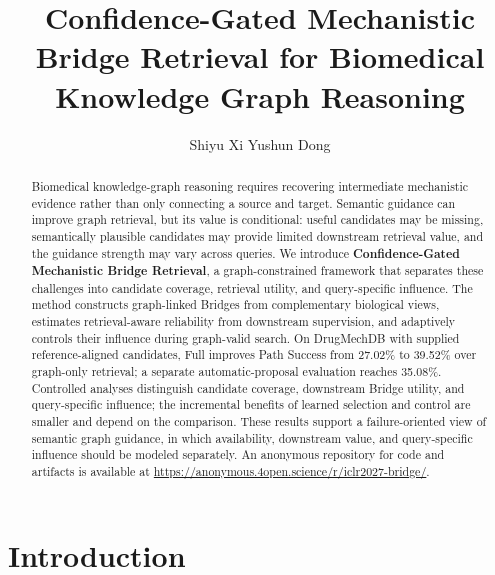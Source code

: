 \documentclass{article} %
\title{
Confidence-Gated Mechanistic\\
Bridge Retrieval for Biomedical\\
Knowledge Graph Reasoning
}
\author{
Shiyu Xi
\And
Yushun Dong
}
\newcommand{\rev}[1]{{\color{blue}#1}}
\begin{document}
 \raggedbottom


\maketitle

\maketitle
\begin{abstract}
Biomedical knowledge-graph reasoning requires recovering intermediate mechanistic evidence rather than only connecting a source and target. Semantic guidance can improve graph retrieval, but its value is conditional: useful candidates may be missing, semantically plausible candidates may provide limited downstream retrieval value, and the guidance strength may vary across queries. We introduce \textbf{Confidence-Gated Mechanistic Bridge Retrieval}, a graph-constrained framework that separates these challenges into candidate coverage, retrieval utility, and query-specific influence. The method constructs graph-linked Bridges from complementary biological views, estimates retrieval-aware reliability from downstream supervision, and adaptively controls their influence during graph-valid search. On DrugMechDB \rev{with supplied reference-aligned candidates, Full improves Path Success from 27.02\% to 39.52\% over graph-only retrieval; a separate automatic-proposal evaluation reaches 35.08\%.} Controlled analyses distinguish candidate coverage, downstream Bridge utility, and query-specific influence; \rev{the incremental benefits of learned selection and control are smaller and depend on the comparison.} These results support a failure-oriented view of semantic graph guidance, in which availability, downstream value, and query-specific influence should be modeled separately. An anonymous repository for code and artifacts is available at
\url{https://anonymous.4open.science/r/iclr2027-bridge/}.
\end{abstract}
\section{Introduction}
\label{sec:introduction}
\end{document}
